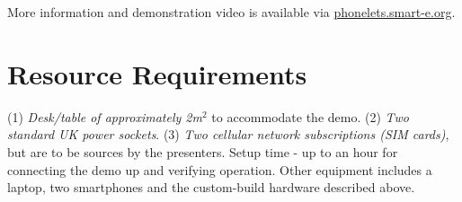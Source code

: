 \documentclass{sig-alternate-10pt}
\begin{document}
More information and demonstration video is available via \url{phonelets.smart-e.org}.


\section*{Resource Requirements}

(1) \emph{Desk/table of approximately 2m$^2$} to accommodate the demo. (2) \emph{Two standard UK power sockets}. (3) \emph{Two cellular network subscriptions (SIM cards)}, but are to be sources by the presenters. Setup time - up to an hour for connecting the demo up and verifying operation. Other equipment includes a laptop, two smartphones and the custom-build hardware described above.


{\footnotesize 


}

%
\end{document}
